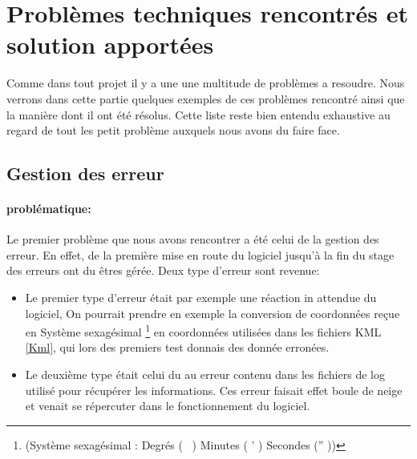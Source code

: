 \section{Problèmes techniques rencontrés et solution apportées}
Comme dans tout projet il y a une une multitude de problèmes a resoudre. Nous verrons dans cette partie quelques exemples de ces problèmes rencontré ainsi que la manière dont il ont été résolus. Cette liste reste bien entendu exhaustive au regard de tout les petit problème auxquels nous avons du faire face.

    \subsection{Gestion des erreur}
            \paragraph{problématique:}
Le premier problème que nous avons rencontrer a été celui de la gestion des erreur. En effet, de la première mise en route du logiciel jusqu'à la fin du stage des erreurs ont du êtres gérée. Deux type d'erreur sont revenue:
\begin{itemize}
    \item Le premier type d'erreur était par exemple une réaction in attendue du logiciel, On pourrait prendre en exemple la conversion de coordonnées reçue en Système sexagésimal \footnote{(Système sexagésimal : Degrés ( \degres\ ) Minutes ( ' ) Secondes ('' ))} en coordonnées utilisées dans les fichiers KML \vref{Kml}, qui lors des premiers test donnais des donnée erronées.
    \item Le deuxième type était celui du au erreur contenu dans les fichiers de log utilisé pour récupérer les informations. Ces erreur faisait effet boule de neige et venait se répercuter dans le fonctionnement du logiciel.
\end{itemize}

